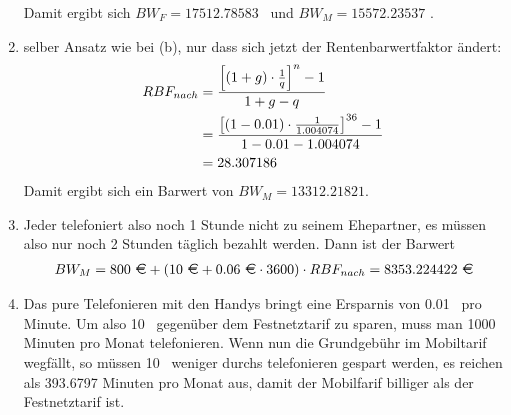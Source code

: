 \documentclass{article}
\begin{document}
\begin{enumerate}[label=(\alph*)]
		Damit ergibt sich $BW_F=17512.78583$ \EUR\, und $BW_M=15572.23537$ \EUR.
		\item selber Ansatz wie bei (b), nur dass sich jetzt der Rentenbarwertfaktor ändert:
		\begin{align}
			RBF_{nach} &= \frac{\left[(1+g)\cdot\frac{1}{q}\right]^n-1}{1+g-q} \notag \\
			&= \frac{\left[(1-0.01)\cdot\frac{1}{1.004074}\right]^{36}-1}{1-0.01-1.004074} \notag \\
			&= 28.307186 \notag
		\end{align}
		Damit ergibt sich ein Barwert von $BW_M=13312.21821$.
		\item Jeder telefoniert also noch 1 Stunde nicht zu seinem Ehepartner, es müssen also nur noch 2 Stunden täglich bezahlt werden. Dann ist der Barwert
		\begin{align}
			BW_M=800 \text{ \EUR}+(10\text{ \EUR}+0.06\text{ \EUR}\cdot 3600)\cdot RBF_{nach} = 8353.224422 \text{ \EUR} \notag
		\end{align}
		\item Das pure Telefonieren mit den Handys bringt eine Ersparnis von 0.01 \EUR\, pro Minute. Um also 10 \EUR\, gegenüber dem Festnetztarif zu sparen, muss man 1000 Minuten pro Monat telefonieren. Wenn nun die Grundgebühr im Mobiltarif wegfällt, so müssen 10 \EUR\, weniger durchs telefonieren gespart werden, es reichen als 393.6797 Minuten pro Monat aus, damit der Mobilfarif billiger als der Festnetztarif ist.
	\end{enumerate}
	
	
\end{document}
